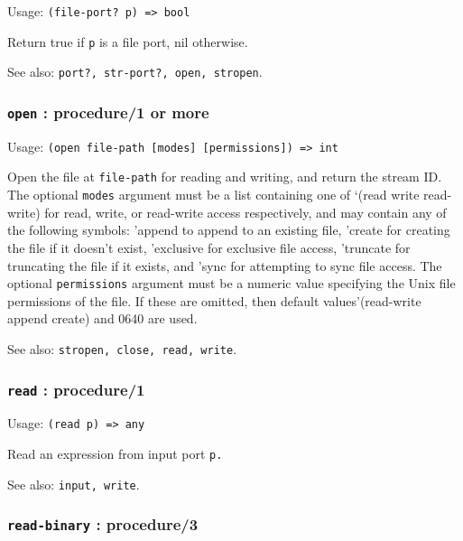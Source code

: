 \documentclass[
]{article}
\newcommand{\passthrough}[1]{#1}
\begin{document}
Usage: \passthrough{\lstinline!(file-port? p) => bool!}

Return true if \passthrough{\lstinline!p!} is a file port, nil
otherwise.

See also: \passthrough{\lstinline!port?, str-port?, open, stropen!}.

\hypertarget{open-procedure1-or-more}{%
\subsubsection{\texorpdfstring{\texttt{open} : procedure/1 or
more}{open : procedure/1 or more}}\label{open-procedure1-or-more}}

Usage:
\passthrough{\lstinline!(open file-path [modes] [permissions]) => int!}

Open the file at \passthrough{\lstinline!file-path!} for reading and
writing, and return the stream ID. The optional
\passthrough{\lstinline!modes!} argument must be a list containing one
of `(read write read-write) for read, write, or read-write access
respectively, and may contain any of the following symbols: 'append to
append to an existing file, 'create for creating the file if it doesn't
exist, 'exclusive for exclusive file access, 'truncate for truncating
the file if it exists, and 'sync for attempting to sync file access. The
optional \passthrough{\lstinline!permissions!} argument must be a
numeric value specifying the Unix file permissions of the file. If these
are omitted, then default values'(read-write append create) and 0640 are
used.

See also: \passthrough{\lstinline!stropen, close, read, write!}.

\hypertarget{read-procedure1}{%
\subsubsection{\texorpdfstring{\texttt{read} :
procedure/1}{read : procedure/1}}\label{read-procedure1}}

Usage: \passthrough{\lstinline!(read p) => any!}

Read an expression from input port \passthrough{\lstinline!p.!}

See also: \passthrough{\lstinline!input, write!}.

\hypertarget{read-binary-procedure3}{%
\subsubsection{\texorpdfstring{\texttt{read-binary} :
procedure/3}{read-binary : procedure/3}}\label{read-binary-procedure3}}
\end{document}
